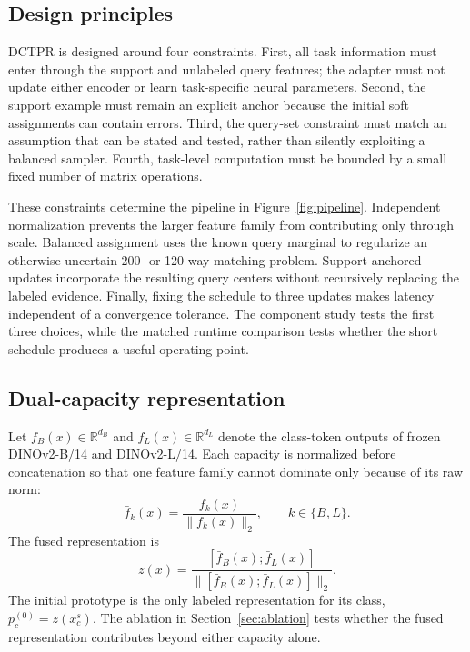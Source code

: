\documentclass[10pt,twocolumn]{article}
\newcommand{\method}{\textsc{DCTPR}\xspace}
\begin{document}
\subsection{Design principles}

\method is designed around four constraints. First, all task information must
enter through the support and unlabeled query features; the adapter must not
update either encoder or learn task-specific neural parameters. Second, the
support example must remain an explicit anchor because the initial soft
assignments can contain errors. Third, the query-set constraint must match an
assumption that can be stated and tested, rather than silently exploiting a
balanced sampler. Fourth, task-level computation must be bounded by a small
fixed number of matrix operations.

These constraints determine the pipeline in Figure~\ref{fig:pipeline}.
Independent normalization prevents the larger feature family from contributing
only through scale. Balanced assignment uses the known query marginal to
regularize an otherwise uncertain 200- or 120-way matching problem.
Support-anchored updates incorporate the resulting query centers without
recursively replacing the labeled evidence. Finally, fixing the schedule to
three updates makes latency independent of a convergence tolerance. The
component study tests the first three choices, while the matched runtime
comparison tests whether the short schedule produces a useful operating point.

\subsection{Dual-capacity representation}

Let $f_B(x)\in\mathbb{R}^{d_B}$ and
$f_L(x)\in\mathbb{R}^{d_L}$ denote the class-token outputs of frozen DINOv2-B/14
and DINOv2-L/14. Each capacity is normalized before concatenation so that one
feature family cannot dominate only because of its raw norm:
\begin{equation}
 \bar f_k(x)=\frac{f_k(x)}{\lVert f_k(x)\rVert_2},\qquad k\in\{B,L\}.
\end{equation}
The fused representation is
\begin{equation}
 z(x)=\frac{[\bar f_B(x);\bar f_L(x)]}
 {\lVert[\bar f_B(x);\bar f_L(x)]\rVert_2}.
 \label{eq:fusion}
\end{equation}
The initial prototype is the only labeled representation for its class,
$p_c^{(0)}=z(x_c^s)$. The ablation in Section~\ref{sec:ablation} tests whether
the fused representation contributes beyond either capacity alone.
\end{document}
